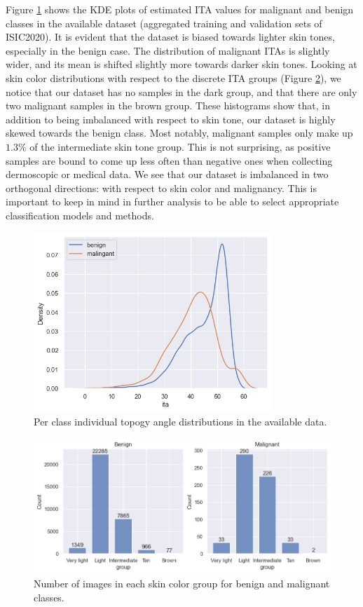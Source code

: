 Figure \ref{fig:kde} shows the KDE plots of estimated ITA values for malignant and benign classes in the available dataset (aggregated training and validation sets of ISIC2020). It is evident that the dataset is biased towards lighter skin tones, especially in the benign case. The distribution of malignant ITAs is slightly wider, and its mean is shifted slightly more towards darker skin tones. Looking at skin color distributions with respect to the discrete ITA groups (Figure \ref{fig:histograms}), we notice that our dataset has no samples in the dark group, and that there are only two malignant samples in the brown group. These histograms show that, in addition to being imbalanced with respect to skin tone, our dataset is highly skewed towards the benign class. Most notably, malignant samples only make up $1.3 \%$ of the intermediate skin tone group. This is not surprising, as positive samples are bound to come up less often than negative ones when collecting dermoscopic or medical data. We see that our dataset is imbalanced in two orthogonal directions: with respect to skin color and malignancy. This is important to keep in mind in further analysis to be able to select appropriate classification models and methods.

\begin{figure}[htpb]
     \centering
     \includegraphics[width=0.8\textwidth]{figures/eda/kde.png}
     \caption{Per class individual topogy angle distributions in the available data.}
     \label{fig:kde}
\end{figure}
\begin{figure}[htpb]
     \centering
     \includegraphics[width=\textwidth]{figures/eda/histograms.png}
     \caption{Number of images in each skin color group for benign and malignant classes.}
     \label{fig:histograms}
 \end{figure}

